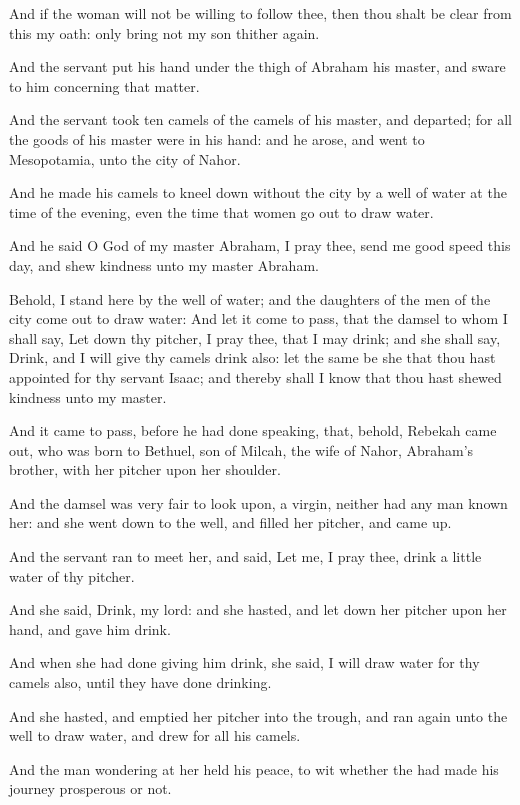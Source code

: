 \Verse And if the woman will not be willing to follow thee, then thou shalt be clear from this my oath: only bring not my son thither again.

\Verse And the servant put his hand under the thigh of Abraham his master, and sware to him concerning that matter.

\Verse And the servant took ten camels of the camels of his master, and departed; for all the goods of his master were in his hand: and he arose, and went to Mesopotamia, unto the city of Nahor.

\Verse And he made his camels to kneel down without the city by a well of water at the time of the evening, even the time that women go out to draw water.

\Verse And he said O \LORD God of my master Abraham, I pray thee, send me good speed this day, and shew kindness unto my master Abraham.

\Verse Behold, I stand here by the well of water; and the daughters of the men of the city come out to draw water: \Verse And let it come to pass, that the damsel to whom I shall say, Let down thy pitcher, I pray thee, that I may drink; and she shall say, Drink, and I will give thy camels drink also: let the same be she that thou hast appointed for thy servant Isaac; and thereby shall I know that thou hast shewed kindness unto my master.

\Verse And it came to pass, before he had done speaking, that, behold, Rebekah came out, who was born to Bethuel, son of Milcah, the wife of Nahor, Abraham's brother, with her pitcher upon her shoulder.

\Verse And the damsel was very fair to look upon, a virgin, neither had any man known her: and she went down to the well, and filled her pitcher, and came up.

\Verse And the servant ran to meet her, and said, Let me, I pray thee, drink a little water of thy pitcher.

\Verse And she said, Drink, my lord: and she hasted, and let down her pitcher upon her hand, and gave him drink.

\Verse And when she had done giving him drink, she said, I will draw water for thy camels also, until they have done drinking.

\Verse And she hasted, and emptied her pitcher into the trough, and ran again unto the well to draw water, and drew for all his camels.

\Verse And the man wondering at her held his peace, to wit whether the \LORD had made his journey prosperous or not.

